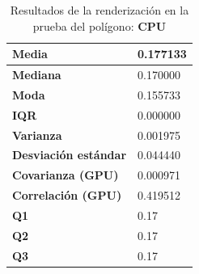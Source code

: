 \begin{table}[htp]
\centering


    
    \begin{center}
    \begin{tabular}{ | l | l | }
        
        
        \hline
        \textbf{Media}  & 0.177133 \\
        \hline
        \textbf{Mediana} & 0.170000 \\
        \hline
        \textbf{Moda} & 0.155733 \\
        \hline
        \textbf{IQR} & 0.000000 \\
        \hline
        \textbf{Varianza} & 0.001975 \\
        \hline
        \textbf{Desviación estándar} & 0.044440 \\
        \hline
        \textbf{Covarianza (GPU)} & 0.000971 \\
        \hline
        \textbf{Correlación (GPU)} & 0.419512 \\
        \hline
        \textbf{Q1} & 0.17 \\
        \hline
        \textbf{Q2} & 0.17 \\
        \hline
        \textbf{Q3} & 0.17 \\
        \hline
        
    \end{tabular} 
    \end{center}
    
    \caption{Resultados de la renderización en la prueba del polígono: \textbf{CPU}}
    
    \label{table:results-animation-render-cpu}
\end{table}